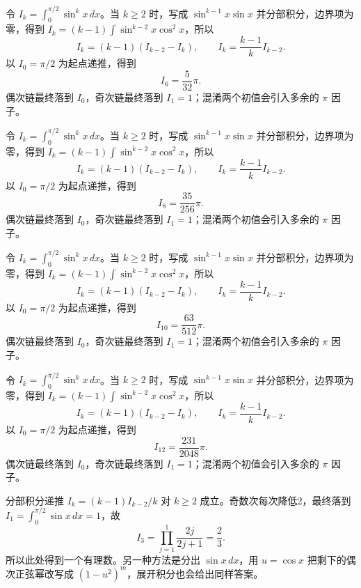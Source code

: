 \documentclass[12pt,fontset=fandol]{ctexart}
\begin{document}
\begin{solve}\label{ans:c16q3}
令 $I_k=\int_0^{\pi/2}\sin^kx\,dx$。当 $k\ge2$ 时，写成 $\sin^{k-1}x\sin x$ 并分部积分，边界项为零，得到 $I_k=(k-1)\int\sin^{k-2}x\cos^2x$，所以
\[
I_k=(k-1)(I_{k-2}-I_k),\qquad I_k=\frac{k-1}{k}I_{k-2}.
\]
以 $I_0=\pi/2$ 为起点递推，得到
\[
I_{6}=\frac{5}{32}\pi.
\]
偶次链最终落到 $I_0$，奇次链最终落到 $I_1=1$；混淆两个初值会引入多余的 $\pi$ 因子。
\end{solve}

\begin{solve}\label{ans:c16q4}
令 $I_k=\int_0^{\pi/2}\sin^kx\,dx$。当 $k\ge2$ 时，写成 $\sin^{k-1}x\sin x$ 并分部积分，边界项为零，得到 $I_k=(k-1)\int\sin^{k-2}x\cos^2x$，所以
\[
I_k=(k-1)(I_{k-2}-I_k),\qquad I_k=\frac{k-1}{k}I_{k-2}.
\]
以 $I_0=\pi/2$ 为起点递推，得到
\[
I_{8}=\frac{35}{256}\pi.
\]
偶次链最终落到 $I_0$，奇次链最终落到 $I_1=1$；混淆两个初值会引入多余的 $\pi$ 因子。
\end{solve}

\begin{solve}\label{ans:c16q5}
令 $I_k=\int_0^{\pi/2}\sin^kx\,dx$。当 $k\ge2$ 时，写成 $\sin^{k-1}x\sin x$ 并分部积分，边界项为零，得到 $I_k=(k-1)\int\sin^{k-2}x\cos^2x$，所以
\[
I_k=(k-1)(I_{k-2}-I_k),\qquad I_k=\frac{k-1}{k}I_{k-2}.
\]
以 $I_0=\pi/2$ 为起点递推，得到
\[
I_{10}=\frac{63}{512}\pi.
\]
偶次链最终落到 $I_0$，奇次链最终落到 $I_1=1$；混淆两个初值会引入多余的 $\pi$ 因子。
\end{solve}

\begin{solve}\label{ans:c16q6}
令 $I_k=\int_0^{\pi/2}\sin^kx\,dx$。当 $k\ge2$ 时，写成 $\sin^{k-1}x\sin x$ 并分部积分，边界项为零，得到 $I_k=(k-1)\int\sin^{k-2}x\cos^2x$，所以
\[
I_k=(k-1)(I_{k-2}-I_k),\qquad I_k=\frac{k-1}{k}I_{k-2}.
\]
以 $I_0=\pi/2$ 为起点递推，得到
\[
I_{12}=\frac{231}{2048}\pi.
\]
偶次链最终落到 $I_0$，奇次链最终落到 $I_1=1$；混淆两个初值会引入多余的 $\pi$ 因子。
\end{solve}

\begin{solve}\label{ans:c16q7}
分部积分递推 $I_k=(k-1)I_{k-2}/k$ 对 $k\ge2$ 成立。奇数次每次降低2，最终落到 $I_1=\int_0^{\pi/2}\sin x\,dx=1$，故
\[
I_{3}=\prod_{j=1}^{1}\frac{2j}{2j+1}=\frac{2}{3}.
\]
所以此处得到一个有理数。另一种方法是分出 $\sin x\,dx$，用 $u=\cos x$ 把剩下的偶次正弦幂改写成 $(1-u^2)^m$，展开积分也会给出同样答案。
\end{solve}
\end{document}
